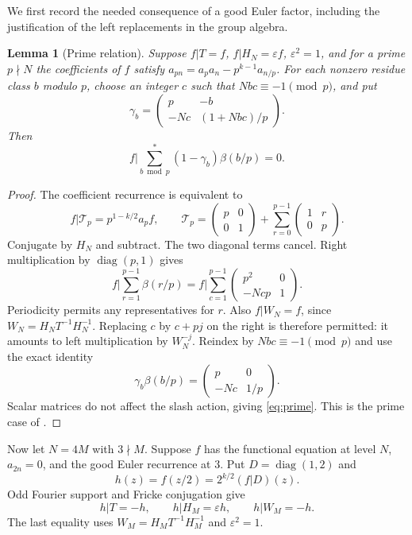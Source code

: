 \documentclass[11pt]{article}
\newtheorem{lemma}[theorem]{Lemma}
\theoremstyle{remark}
\newcommand{\eps}{\varepsilon}
\newcommand{\bb}{\beta}
\begin{document}
We first record the needed consequence of a good Euler factor, including
the justification of the left replacements in the group algebra.

\begin{lemma}[Prime relation]\label{lem:prime}
Suppose $f|T=f$, $f|H_N=\eps f$, $\eps^2=1$, and for a prime
$p\nmid N$ the coefficients of $f$ satisfy
$a_{pn}=a_pa_n-p^{k-1}a_{n/p}$. For each nonzero residue class $b$
modulo $p$, choose an integer $c$ such that $Nbc\equiv-1\pmod p$,
and put
\[
 \gamma_b=\begin{pmatrix}p&-b\\-Nc&(1+Nbc)/p\end{pmatrix}.
\]
Then
\begin{equation}\label{eq:prime}
 f\bigg|\sum_{b\bmod p}^{*}(1-\gamma_b)\bb(b/p)=0.
\end{equation}
\end{lemma}
\begin{proof}
The coefficient recurrence is equivalent to
\[
 f|\mathcal T_p=p^{1-k/2}a_pf,\qquad
 \mathcal T_p=\begin{pmatrix}p&0\\0&1\end{pmatrix}
 +\sum_{r=0}^{p-1}\begin{pmatrix}1&r\\0&p\end{pmatrix}.
\]
Conjugate by $H_N$ and subtract. The two diagonal terms cancel.
Right multiplication by $\operatorname{diag}(p,1)$ gives
\[
 f\bigg|\sum_{r=1}^{p-1}\bb(r/p)
 =f\bigg|\sum_{c=1}^{p-1}\begin{pmatrix}p^2&0\\-Ncp&1\end{pmatrix}.
\]
Periodicity permits any representatives for $r$. Also
$f|W_N=f$, since $W_N=H_NT^{-1}H_N^{-1}$.
Replacing $c$ by $c+pj$ on the right is therefore permitted:
it amounts to left multiplication by $W_N^{-j}$.
Reindex by $Nbc\equiv-1\pmod p$ and use the exact identity
\[
 \gamma_b\bb(b/p)=\begin{pmatrix}p&0\\-Nc&1/p\end{pmatrix}.
\]
Scalar matrices do not affect the slash action, giving \eqref{eq:prime}.
This is the prime case of \cite[Corollary~2]{CF}.
\end{proof}

Now let $N=4M$ with $3\nmid M$. Suppose $f$ has the functional
equation at level $N$, $a_{2n}=0$, and the good Euler recurrence at $3$.
Put $D=\operatorname{diag}(1,2)$ and
\[
 h(z)=f(z/2)=2^{k/2}(f|D)(z).
\]
Odd Fourier support and Fricke conjugation give
\begin{equation}\label{eq:half}
 h|T=-h,\qquad h|H_M=\eps h,\qquad h|W_M=-h.
\end{equation}
The last equality uses $W_M=H_MT^{-1}H_M^{-1}$ and $\eps^2=1$.
\end{document}
